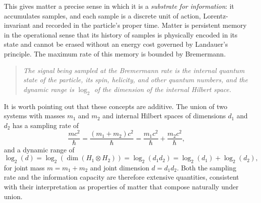 \documentclass[12pt,a4paper]{article}
\begin{document}
%

This gives matter a precise sense in which it is a \emph{substrate for information}: it accumulates samples, and each sample is a discrete unit of action, Lorentz-invariant and recorded in the particle's proper time. Matter is persistent memory in the operational sense that its history of samples is physically encoded in its state and cannot be erased without an energy cost governed by Landauer's principle. The maximum rate of this memory is bounded by Bremermann.

\begin{quote}
\textit{The signal being sampled at the Bremermann rate is the 
internal quantum state of the particle, its spin, helicity, and 
other quantum numbers, and the dynamic range is $\log_2$ of the 
dimension of the internal Hilbert space.}
\end{quote}

It is worth pointing out that these concepts are additive. The union 
of two systems with masses $m_1$ and $m_2$ and internal Hilbert spaces 
of dimensions $d_1$ and $d_2$ has a sampling rate of
\begin{equation}
    \frac{mc^2}{\hbar} = \frac{(m_1+m_2)c^2}{\hbar} 
    = \frac{m_1 c^2}{\hbar} + \frac{m_2 c^2}{\hbar},
\end{equation}
and a dynamic range of
\begin{equation}
    \log_2(d) = \log_2(\dim(H_1 \otimes H_2)) 
    = \log_2(d_1 d_2) 
    = \log_2(d_1) + \log_2(d_2),
\end{equation}
for joint mass $m = m_1 + m_2$ and joint dimension $d = d_1 d_2$. 
Both the sampling rate and the information capacity are therefore 
extensive quantities, consistent with their interpretation as 
properties of matter that compose naturally under union.
\end{document}
